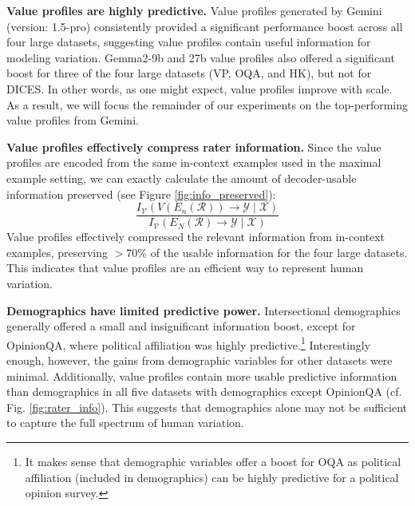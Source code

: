 \documentclass[11pt]{article}
\begin{document}
\textbf{Value profiles are highly predictive.} 
Value profiles generated by Gemini (version: 1.5-pro) consistently provided a significant performance boost across all four large datasets, suggesting value profiles contain useful information for modeling variation. Gemma2-9b and 27b value profiles also offered a significant boost for three of the four large datasets (VP, OQA, and HK), but not for DICES. In other words, as one might expect, value profiles improve with scale. As a result, we will focus the remainder of our experiments on the top-performing value profiles from Gemini.



\textbf{Value profiles effectively compress rater information.}
Since the value profiles are encoded from the same in-context examples used in the maximal example setting, we can exactly calculate the amount of decoder-usable information preserved (see Figure \ref{fig:info_preserved}):
\begin{equation}
\label{eq:info_preserved}
\frac{I_\mathcal{V}(V(E_n(\mathcal{R})) \to \mathcal{Y} \mid \mathcal{X})}{I_\mathcal{V}(E_N(\mathcal{R}) \to \mathcal{Y} \mid \mathcal{X})}
\end{equation}
Value profiles effectively compressed the relevant information from in-context examples, preserving $>$70\% of the usable information for the four large datasets.
This indicates that value profiles are an efficient way to represent human variation.

\textbf{Demographics have limited predictive power.}
Intersectional demographics generally offered a small and insignificant information boost, except for OpinionQA, where political affiliation was highly predictive.\footnote{It makes sense that demographic variables offer a boost for OQA as political affiliation (included in demographics) can be highly predictive for a political opinion survey.} Interestingly enough, however, the gains from demographic variables for other datasets were minimal. Additionally, value profiles contain more usable predictive information than demographics in all five datasets with demographics except OpinionQA (cf. Fig. \ref{fig:rater_info}). This suggests that demographics alone may not be sufficient to capture the full spectrum of human variation.
\end{document}
